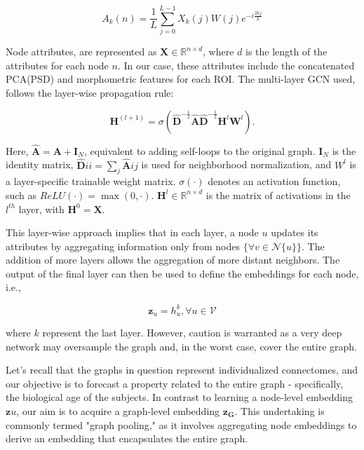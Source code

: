 \documentclass{cys}
\begin{document}
\begin{equation}
A_k(n) = \frac{1}{L} \sum_{j=0}^{L-1}X_k(j)W(j)e^{-i{\frac{2kj}{L}}}
\end{equation} 



\bigskip
Node attributes, are represented as $\mathbf{X} \in \mathbb{R}^{n\times d}$, where $d$ is the length of the attributes for each node $n$. In our case, these attributes include the concatenated PCA(PSD) and morphometric features for each ROI. The multi-layer GCN used, follows the layer-wise propagation rule:

\begin{equation}
\mathbf{H}^{(l+1)}=\sigma \left(\hat{\mathbf{D}}^{-\frac{1}{2}} \hat{\mathbf{A}}\hat{\mathbf{D}}^{-\frac{1}{2}} \mathbf{H}^{l} \mathbf{W}^l \right).
\end{equation}

\bigskip
Here, $\hat{\mathbf{A}} = \mathbf{A} + \mathbf{I}_N$, equivalent to adding self-loops to the original graph. $\mathbf{I}_N$ is the identity matrix, $\hat{\mathbf{D}}{ii}=\sum_j \hat{\mathbf{A}}{ij}$ is used for neighborhood normalization, and $W^l$ is a layer-specific trainable weight matrix. $\sigma(\cdot)$ denotes an activation function, such as $ReLU(\cdot) = \max(0, \cdot)$. $\mathbf{H}^l \in \mathbb{R}^{n \times d} $ is the matrix of activations in the $l^{th}$ layer, with $\mathbf{H}^0 = \mathbf{X}$.

\bigskip
This layer-wise approach implies that in each layer, a node $u$ updates its attributes by aggregating information only from nodes $\{ \forall v \in \mathcal{N}\{ u \} \}$. The addition of more layers allows the aggregation of more distant neighbors. The output of the final layer can then be used to define the embeddings for each node, i.e.,

\begin{equation}
\mathbf{z}_u = h_u^k, \forall u \in \mathcal{V}
\end{equation}

where $k$ represent the last layer. However, caution is warranted as a very deep network may oversample the graph and, in the worst case, cover the entire graph.

\bigskip
Let's recall that the graphs in question represent individualized connectomes, and our objective is to forecast a property related to the entire graph - specifically, the biological age of the subjects. In contrast to learning a node-level embedding $\mathbf{z}u$, our aim is to acquire a graph-level embedding $\mathbf{z}_{\mathbf{G}}$. This undertaking is commonly termed "graph pooling," as it involves aggregating node embeddings to derive an embedding that encapsulates the entire graph.
\end{document}
